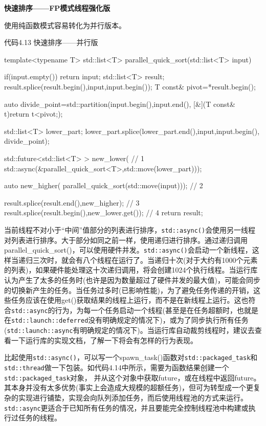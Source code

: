 \textbf{快速排序——FP模式线程强化版}

使用纯函数模式容易转化为并行版本。

代码4.13 快速排序——并行版

\begin{cpp}
template<typename T>
std::list<T> parallel_quick_sort(std::list<T> input)
{
  if(input.empty())
  {
    return input;
  }
  std::list<T> result;
  result.splice(result.begin(),input,input.begin());
  T const& pivot=*result.begin();

  auto divide_point=std::partition(input.begin(),input.end(),
                [&](T const& t){return t<pivot;});

  std::list<T> lower_part;
  lower_part.splice(lower_part.end(),input,input.begin(),
                divide_point);

  std::future<std::list<T> > new_lower(  // 1
                std::async(&parallel_quick_sort<T>,std::move(lower_part)));

  auto new_higher(
                parallel_quick_sort(std::move(input)));  // 2

  result.splice(result.end(),new_higher);  // 3
  result.splice(result.begin(),new_lower.get());  // 4
  return result;
}
\end{cpp}

当前线程不对小于“中间”值部分的列表进行排序，\texttt{std::async()}会使用另一线程对列表进行排序。大于部分如同之前一样，使用递归进行排序。通过递归调用parallel\_quick\_sort()，可以使用硬件并发。\texttt{std::async()}会启动一个新线程，这样当递归三次时，就会有八个线程在运行了。当递归十次(对于大约有1000个元素的列表)，如果硬件能处理这十次递归调用，将会创建1024个执行线程。当运行库认为产生了太多的任务时(也许是因为数量超过了硬件并发的最大值)，可能会同步的切换新产生的任务。当任务过多时(已影响性能)，为了避免任务传递的开销，这些任务应该在使用get()获取结果的线程上运行，而不是在新线程上运行。这也符合\texttt{std::async}的行为，为每一个任务启动一个线程(甚至是在任务超额时，也就是在\texttt{std::launch::deferred}没有明确规定的情况下)，或为了同步执行所有任务(\texttt{std::launch::async}有明确规定的情况下)。当运行库自动裁剪线程时，建议去查看一下运行库的实现文档，了解一下将会有怎样的行为表现。

比起使用\texttt{std::async()}，可以写一个spawn\_task()函数对\texttt{std::packaged\_task}和\texttt{std::thread}做一下包装。如代码4.14中所示，需要为函数结果创建一个\texttt{std::packaged\_task}对象， 并从这个对象中获取future，或在线程中返回future。其本身并没有太多优势(事实上会造成大规模的超额任务)，但可为转型成一个更复杂的实现进行铺垫，实现会向队列添加任务，而后使用线程池的方式来运行。\texttt{std::async}更适合于已知所有任务的情况，并且要能完全控制线程池中构建或执行过任务的线程。

